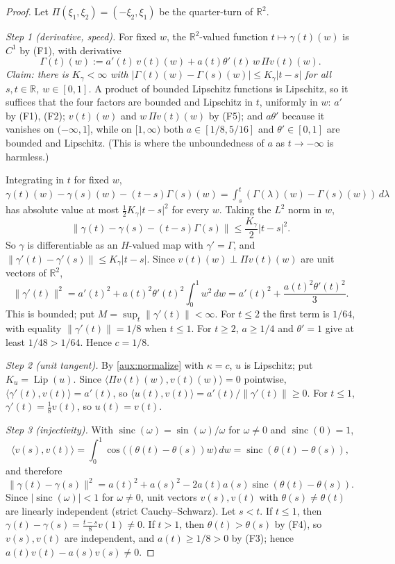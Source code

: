 \documentclass[11pt]{article}
\newcommand{\R}{\mathbb R}
\newcommand{\norm}[1]{\lVert #1\rVert}
\newcommand{\ip}[2]{\langle #1,#2\rangle}
\DeclareMathOperator{\Lip}{Lip}
\DeclareMathOperator{\sinc}{sinc}
\theoremstyle{definition}
\numberwithin{equation}{section}
\begin{document}
\begin{proof}
Let \(\Pi(\xi_1,\xi_2)=(-\xi_2,\xi_1)\) be the quarter-turn of \(\R^2\).

\emph{Step 1 (derivative, speed).} For fixed \(w\), the \(\R^2\)-valued
function \(t\mapsto\gamma(t)(w)\) is \(C^1\) by (F1), with derivative
\[
 \Gamma(t)(w):=a'(t)\,v(t)(w)+a(t)\theta'(t)\,w\,\Pi v(t)(w).
\]
\emph{Claim: there is \(K_\gamma<\infty\) with
\(|\Gamma(t)(w)-\Gamma(s)(w)|\le K_\gamma|t-s|\) for all
\(s,t\in\R\), \(w\in[0,1]\).} A product of bounded Lipschitz functions is
Lipschitz, so it suffices that the four factors are bounded and Lipschitz
in \(t\), uniformly in \(w\): \(a'\) by (F1), (F2); \(v(t)(w)\) and
\(w\,\Pi v(t)(w)\) by (F5); and \(a\theta'\) because it vanishes on
\((-\infty,1]\), while on \([1,\infty)\) both \(a\in[1/8,5/16]\) and
\(\theta'\in[0,1]\) are bounded and Lipschitz. (This is where the
unboundedness of \(a\) as \(t\to-\infty\) is harmless.)

Integrating in \(t\) for fixed \(w\),
\(\gamma(t)(w)-\gamma(s)(w)-(t-s)\Gamma(s)(w)
=\int_s^t(\Gamma(\lambda)(w)-\Gamma(s)(w))\,d\lambda\) has absolute value
at most \(\tfrac12K_\gamma|t-s|^2\) for every \(w\). Taking the \(L^2\)
norm in \(w\),
\begin{equation}\label{aux:taylor}
 \norm{\gamma(t)-\gamma(s)-(t-s)\Gamma(s)}
 \le\frac{K_\gamma}{2}|t-s|^2 .
\end{equation}
So \(\gamma\) is differentiable as an \(H\)-valued map with
\(\gamma'=\Gamma\), and \(\norm{\gamma'(t)-\gamma'(s)}\le K_\gamma|t-s|\).
Since \(v(t)(w)\perp\Pi v(t)(w)\) are unit vectors of \(\R^2\),
\[
 \norm{\gamma'(t)}^2=a'(t)^2+a(t)^2\theta'(t)^2\int_0^1w^2\,dw
 =a'(t)^2+\frac{a(t)^2\theta'(t)^2}{3}.
\]
This is bounded; put \(M=\sup_t\norm{\gamma'(t)}<\infty\). For \(t\le2\)
the first term is \(1/64\), with equality \(\norm{\gamma'(t)}=1/8\) when
\(t\le1\). For \(t\ge2\), \(a\ge1/4\) and \(\theta'=1\) give at least
\(1/48>1/64\). Hence \(c=1/8\).

\emph{Step 2 (unit tangent).} By \eqref{aux:normalize} with \(\kappa=c\),
\(u\) is Lipschitz; put \(K_u=\Lip(u)\). Since
\(\ip{\Pi v(t)(w)}{v(t)(w)}=0\) pointwise,
\(\ip{\gamma'(t)}{v(t)}=a'(t)\), so
\(\ip{u(t)}{v(t)}=a'(t)/\norm{\gamma'(t)}\ge0\). For \(t\le1\),
\(\gamma'(t)=\tfrac18v(t)\), so \(u(t)=v(t)\).

\emph{Step 3 (injectivity).} With \(\sinc(\omega)=\sin(\omega)/\omega\)
for \(\omega\ne0\) and \(\sinc(0)=1\),
\[
 \ip{v(s)}{v(t)}=\int_0^1\cos\bigl((\theta(t)-\theta(s))w\bigr)\,dw
 =\sinc(\theta(t)-\theta(s)),
\]
and therefore
\begin{equation}\label{aux:distance}
 \norm{\gamma(t)-\gamma(s)}^2
 =a(t)^2+a(s)^2-2a(t)a(s)\sinc(\theta(t)-\theta(s)).
\end{equation}
Since \(|\sinc(\omega)|<1\) for \(\omega\ne0\), unit vectors \(v(s),v(t)\)
with \(\theta(s)\ne\theta(t)\) are linearly independent (strict
Cauchy--Schwarz). Let \(s<t\). If \(t\le1\), then
\(\gamma(t)-\gamma(s)=\tfrac{t-s}{8}v(1)\ne0\). If \(t>1\), then
\(\theta(t)>\theta(s)\) by (F4), so \(v(s),v(t)\) are independent, and
\(a(t)\ge1/8>0\) by (F3); hence \(a(t)v(t)-a(s)v(s)\ne0\).


\end{proof}
\end{document}
